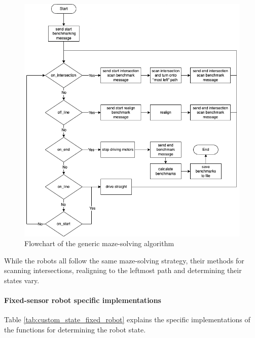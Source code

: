 \begin{figure}[hbt!]
    \centering
    \includegraphics[width=\textwidth]{resources/generic-maze-solving-algorithm.png}
    \caption{Flowchart of the generic maze-solving algorithm}
    \label{fig:generic_maze_solving_algorithm}
\end{figure}

While the robots all follow the same maze-solving strategy, their methods for scanning intersections, realigning to the leftmost path and determining their states vary.

\clearpage

\paragraph{Fixed-sensor robot specific implementations}

Table \ref{tab:custom_state_fixed_robot} explains the specific implementations of the functions for determining the robot state.


